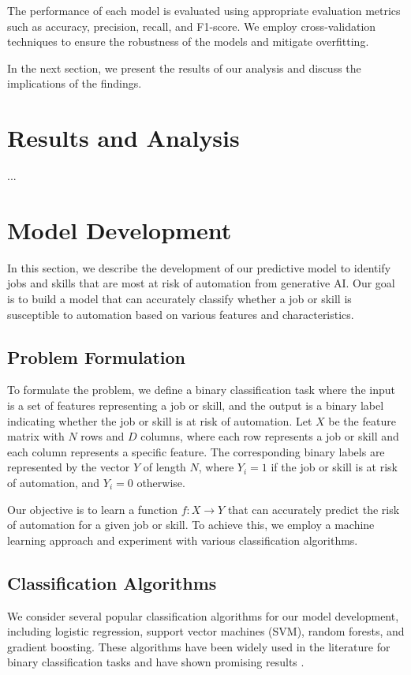 \documentclass{article}
\begin{document}
The performance of each model is evaluated using appropriate evaluation metrics such as accuracy, precision, recall, and F1-score. We employ cross-validation techniques to ensure the robustness of the models and mitigate overfitting.

In the next section, we present the results of our analysis and discuss the implications of the findings.

\section{Results and Analysis}

...
\section{Model Development}

In this section, we describe the development of our predictive model to identify jobs and skills that are most at risk of automation from generative AI. Our goal is to build a model that can accurately classify whether a job or skill is susceptible to automation based on various features and characteristics.

\subsection{Problem Formulation}

To formulate the problem, we define a binary classification task where the input is a set of features representing a job or skill, and the output is a binary label indicating whether the job or skill is at risk of automation. Let $X$ be the feature matrix with $N$ rows and $D$ columns, where each row represents a job or skill and each column represents a specific feature. The corresponding binary labels are represented by the vector $Y$ of length $N$, where $Y_i = 1$ if the job or skill is at risk of automation, and $Y_i = 0$ otherwise.

Our objective is to learn a function $f: X \rightarrow Y$ that can accurately predict the risk of automation for a given job or skill. To achieve this, we employ a machine learning approach and experiment with various classification algorithms.

\subsection{Classification Algorithms}

We consider several popular classification algorithms for our model development, including logistic regression, support vector machines (SVM), random forests, and gradient boosting. These algorithms have been widely used in the literature for binary classification tasks and have shown promising results \cite{hastie2009elements}.
\end{document}
